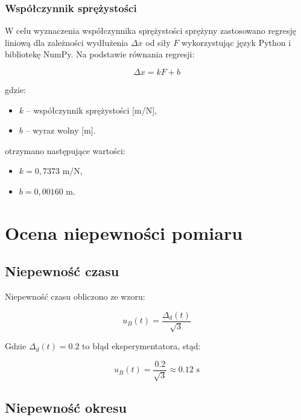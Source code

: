 \documentclass[a4paper,12pt]{article}
\begin{document}
\subsubsection{Współczynnik sprężystości}

W celu wyznaczenia współczynnika sprężystości sprężyny zastosowano regresję liniową dla zależności wydłużenia $\Delta x$ od siły $F$ wykorzystując język Python i bibliotekę NumPy. Na podstawie równania regresji:

\begin{equation*}
    \Delta x = kF + b
\end{equation*}

gdzie:
\begin{itemize}
    \setlength{\itemsep}{0em}
    \item $k$ -- współczynnik sprężystości [m/N],
    \item $b$ -- wyraz wolny [m].
\end{itemize}

otrzymano następujące wartości:
\begin{itemize}
    \setlength{\itemsep}{0em}
    \item $k = 0,7373$ m/N,
    \item $b = 0,00160$ m.
\end{itemize}


\section{Ocena niepewności pomiaru}

\subsection{Niepewność czasu}

Niepewność czasu obliczono ze wzoru:

\begin{equation*}
    u_B(t) = \frac{\Delta_d(t)}{\sqrt{3}}
\end{equation*}

Gdzie $\Delta_d(t) = 0.2$ to błąd eksperymentatora, stąd:

\begin{equation*}
    u_B(t) = \frac{0.2}{\sqrt{3}} \approx 0.12 \text{ s}
\end{equation*}

\subsection{Niepewność okresu}
\end{document}
